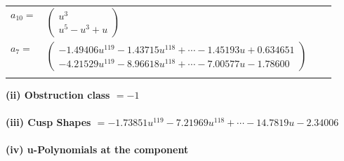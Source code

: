 \documentclass[1p]{elsarticle_modified}
\theoremstyle{definition}
\begin{document}
\begin{tabular}{m{7pt} m{180pt} m{7pt} m{180pt} }
\flushright $a_{10}=$&$\begin{pmatrix}u^3\\u^5- u^3+u\end{pmatrix}$ \\
\flushright $a_{7}=$&$\begin{pmatrix}-1.49406 u^{119}-1.43715 u^{118}+\cdots-1.45193 u+0.634651\\-4.21529 u^{119}-8.96618 u^{118}+\cdots-7.00577 u-1.78600\end{pmatrix}$\\&\end{tabular}
\flushleft \textbf{(ii) Obstruction class $= -1$}\\~\\
\flushleft \textbf{(iii) Cusp Shapes $= -1.73851 u^{119}-7.21969 u^{118}+\cdots-14.7819 u-2.34006$}\\~\\
\newpage\renewcommand{\arraystretch}{1}
\flushleft \textbf{(iv) u-Polynomials at the component}\newline \\
\end{document}
